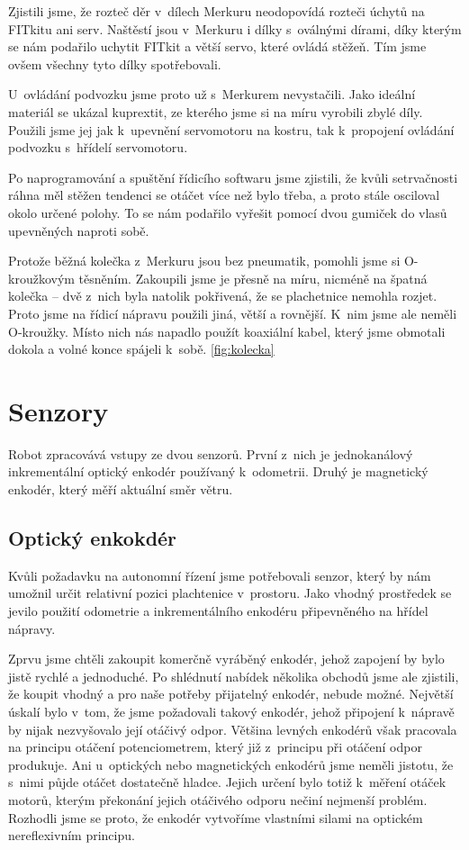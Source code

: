Zjistili jsme, že rozteč děr v~dílech Merkuru neodopovídá rozteči úchytů na FITkitu ani serv. Naštěstí jsou v~Merkuru i dílky s~oválnými dírami, díky kterým se nám podařilo uchytit FITkit a větší servo, které ovládá stěžeň. Tím jsme ovšem všechny tyto dílky spotřebovali.

U~ovládání podvozku jsme proto už s~Merkurem nevystačili. Jako ideální materiál se ukázal kuprextit, ze kterého jsme si na míru vyrobili zbylé díly. Použili jsme jej jak k~upevnění servomotoru na kostru, tak k~propojení ovládání podvozku s~hřídelí servomotoru.

Po naprogramování a spuštění řídicího softwaru jsme zjistili, že kvůli setrvačnosti ráhna měl stěžen tendenci se otáčet více než bylo třeba, a proto stále osciloval okolo určené polohy. To se nám podařilo vyřešit pomocí dvou gumiček do vlasů upevněných naproti sobě.

Protože běžná kolečka z~Merkuru jsou bez pneumatik, pomohli jsme si O-kroužkovým těsněním. Zakoupili jsme je přesně na míru, nicméně na špatná kolečka -- dvě z~nich byla natolik pokřivená, že se plachetnice nemohla rozjet. Proto jsme na řídicí nápravu použili jiná, větší a rovnější. K~nim jsme ale neměli O-kroužky. Místo nich nás napadlo použít koaxiální kabel, který jsme obmotali dokola a volné konce spájeli k~sobě. \ref{fig:kolecka}



\section{Senzory}
Robot zpracovává vstupy ze dvou senzorů. První z~nich je jednokanálový inkrementální optický enkodér používaný k~odometrii. Druhý je magnetický enkodér, který měří aktuální směr větru.

\subsection{Optický enkokdér}
Kvůli požadavku na autonomní řízení jsme potřebovali senzor, který by nám umožnil určit relativní pozici plachtenice v~prostoru. Jako vhodný prostředek se jevilo použití odometrie a inkrementálního enkodéru připevněného na hřídel nápravy.

Zprvu jsme chtěli zakoupit komerčně vyráběný enkodér, jehož zapojení by bylo jistě rychlé a jednoduché. Po shlédnutí nabídek několika obchodů jsme ale zjistili, že koupit vhodný a pro naše potřeby přijatelný enkodér, nebude možné. Největší úskalí bylo v~tom, že jsme požadovali takový enkodér, jehož připojení k~nápravě by nijak nezvyšovalo její otáčivý odpor. Většina levných enkodérů však pracovala na principu otáčení potenciometrem, který již z~principu při otáčení odpor produkuje. Ani u~optických nebo magnetických enkodérů jsme neměli jistotu, že s~nimi půjde otáčet dostatečně hladce. Jejich určení bylo totiž k~měření otáček motorů, kterým překonání jejich otáčivého odporu nečiní nejmenší problém. Rozhodli jsme se proto, že enkodér vytvoříme vlastními silami na optickém nereflexivním principu.

